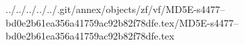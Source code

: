../../../../../.git/annex/objects/zf/vf/MD5E-s4477--bd0e2b61ea356a41759ac92b82f78dfe.tex/MD5E-s4477--bd0e2b61ea356a41759ac92b82f78dfe.tex
